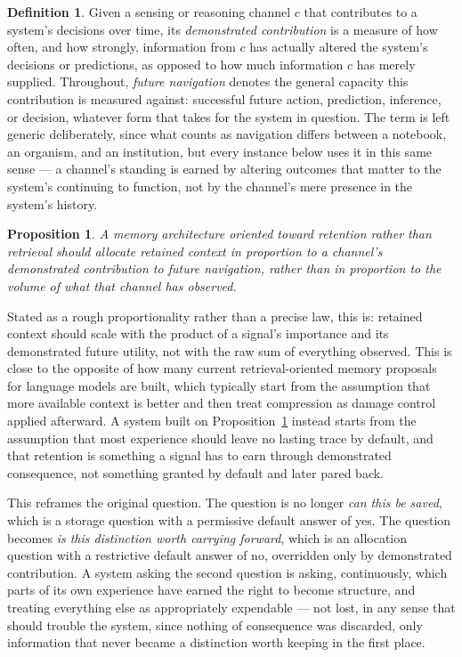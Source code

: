 \documentclass[11pt]{amsart}
\theoremstyle{plain}
\newtheorem{proposition}[theorem]{Proposition}
\theoremstyle{definition}
\newtheorem{definition}[theorem]{Definition}
\theoremstyle{remark}
\begin{document}
\begin{definition}
Given a sensing or reasoning channel $c$ that contributes to a system's
decisions over time, its \emph{demonstrated contribution} is a measure
of how often, and how strongly, information from $c$ has actually
altered the system's decisions or predictions, as opposed to how much
information $c$ has merely supplied. Throughout, \emph{future
navigation} denotes the general capacity this contribution is measured
against: successful future action, prediction, inference, or decision,
whatever form that takes for the system in question. The term is left
generic deliberately, since what counts as navigation differs between a
notebook, an organism, and an institution, but every instance below
uses it in this same sense --- a channel's standing is earned by
altering outcomes that matter to the system's continuing to function,
not by the channel's mere presence in the system's history.
\end{definition}

\begin{proposition}
\label{prop:allocation}
A memory architecture oriented toward retention rather than retrieval
should allocate retained context in proportion to a channel's
demonstrated contribution to future navigation, rather than in
proportion to the volume of what that channel has observed.
\end{proposition}

Stated as a rough proportionality rather than a precise law, this is:
retained context should scale with the product of a signal's importance
and its demonstrated future utility, not with the raw sum of everything
observed. This is close to the opposite of how many current
retrieval-oriented memory proposals for language models are built,
which typically start from the assumption that more available context
is better and then treat compression as damage control applied
afterward. A system built on Proposition~\ref{prop:allocation} instead
starts from the assumption that most experience should leave no lasting
trace by default, and that retention is something a signal has to earn
through demonstrated consequence, not something granted by default and
later pared back.

This reframes the original question. The question is no longer
\emph{can this be saved}, which is a storage question with a
permissive default answer of yes. The question becomes \emph{is this
distinction worth carrying forward}, which is an allocation question
with a restrictive default answer of no, overridden only by
demonstrated contribution. A system asking the second question is
asking, continuously, which parts of its own experience have earned the
right to become structure, and treating everything else as
appropriately expendable --- not lost, in any sense that should trouble
the system, since nothing of consequence was discarded, only
information that never became a distinction worth keeping in the first
place.
\end{document}
